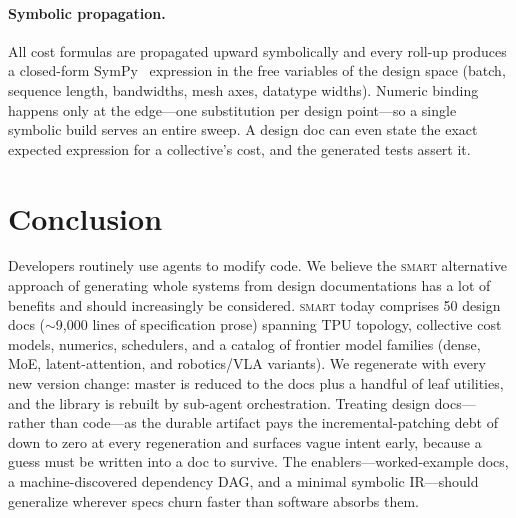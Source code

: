 \documentclass{article}
\begin{document}
\paragraph{Symbolic propagation.} All cost formulas are propagated upward
symbolically and every roll-up produces a closed-form SymPy~\citep{meurer2017sympy}
expression in the free variables of the design space (batch, sequence length,
bandwidths, mesh axes, datatype widths). Numeric binding happens only at the
edge---one substitution per design point---so a single symbolic build serves
an entire sweep. A design doc can even state the exact expected expression
for a collective's cost, and the generated tests assert it.


\section{Conclusion}

Developers routinely use agents to modify code. We believe the \textsc{smart} alternative approach of generating whole systems from design documentations has a lot of benefits and should increasingly be considered.
\textsc{smart} today comprises 50 design docs ($\sim$9{,}000 lines of
specification prose) spanning TPU
topology, collective cost models, numerics, schedulers, and a catalog of
frontier model families (dense, MoE, latent-attention, and robotics/VLA
variants). We regenerate with every new version change: master is reduced to
the docs plus a handful of leaf utilities, and the library is rebuilt by
sub-agent orchestration.
Treating design docs---rather than code---as the durable artifact pays the
incremental-patching debt of  down to zero at every
regeneration and surfaces vague intent early, because a guess must be
written into a doc to survive. The enablers---worked-example docs, a machine-discovered dependency DAG, and a minimal symbolic IR---should generalize wherever specs churn faster than software absorbs them.



\end{document}
